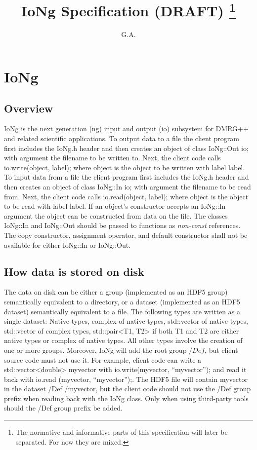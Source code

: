 \documentclass{article}
\newcommand{\code}[1]{{\ttfamily #1}}
\begin{document}
\title{IoNg Specification (DRAFT)
\footnote{The normative and informative parts of this specification will later be separated.
	For now they are mixed.}}
\author{G.A.}
\maketitle

\thispagestyle{fancy}

\section{IoNg}

\subsection{Overview}
\code{IoNg} is the next generation (ng) input and output (io) subsystem for 
\textsc{DMRG++} and related 
scientific applications. To output data to a file the
client program first includes the \code{IoNg.h} header and then creates an object of class
\code{IoNg::Out io;} with argument the filename to be written to.
Next, the client code calls \code{io.write(object, label);} where
\code{object} is the object to be written with label \code{label}.
To input data from a file the client program first includes the 
\code{IoNg.h} header and then creates an object of class
\code{IoNg::In io;} with argument the filename to be read from.
Next, the client code calls \code{io.read(object, label);} where
\code{object} is the object to be read with label \code{label}.
If an object's constructor accepts an \code{IoNg::In} argument the object
can be constructed from data on the file.
The classes \code{IoNg::In} and \code{IoNg::Out} should be passed
to functions as \emph{non-const} references.
The copy constructor, assignment operator, and default constructor shall not
be available for either \code{IoNg::In} or \code{IoNg::Out}.

\subsection{How data is stored on disk}
The data on disk can be either a group (implemented as an HDF5 group) semantically
equivalent to a directory, or a dataset (implemented as an HDF5 dataset)
semantically equivalent to a file.
The following types are written as a single dataset:
Native types, complex of native types, std::vector of native types, 
std::vector of complex types, \code{std::pair<T1, T2>} if both \code{T1} and \code{T2} 
are either native types or complex of native types.
All other types involve the creation of one or more groups.
Moreover, \code{IoNg} will add the root group $/Def$, but client
source code must not use it. For example, client code
can write a \code{std::vector<double>} \code{myvector} with \code{io.write(myvector,} 
\code{``myvector'');}
and read it back with \code{io.read} \code{(myvector,} \code{``myvector'');}.
The HDF5 file will contain \code{myvector}  in the dataset \code{/Def} \code{/myvector,} but the client
code should not use the \code{/Def} group prefix when reading back with the \code{IoNg} class.
Only when using third-party tools should the \code{/Def} group prefix be added.
\end{document}
